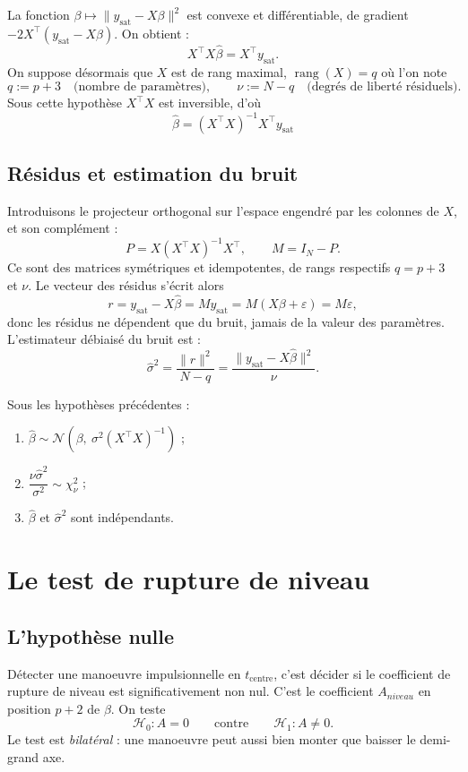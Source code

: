 \documentclass{article}
\theoremstyle{remark}
\begin{document}
La fonction $\beta \mapsto \lVert y_{\mathrm{sat}} - X\beta \rVert^2$ est convexe et différentiable, de
gradient $-2X^{\top}(y_{\mathrm{sat}} - X\beta)$. On obtient : 
\[
X^{\top}X \hat{\beta} = X^{\top} y_{\mathrm{sat}} .
\]
On suppose désormais que $X$ est de rang maximal, $\operatorname{rang}(X) = q$ où l'on note
\[
q := p + 3 \quad \text{(nombre de paramètres)}, \qquad \nu := N - q \quad \text{(degrés de liberté résiduels)} .
\]
Sous cette hypothèse $X^{\top}X$ est inversible, d'où
\[
\boxed{\ \hat{\beta} = (X^{\top}X)^{-1} X^{\top} y_{\mathrm{sat}} \ }
\]

\subsection*{Résidus et estimation du bruit}

Introduisons le projecteur orthogonal sur l'espace engendré par les colonnes de $X$, et son
complément :
\[
P = X(X^{\top}X)^{-1}X^{\top}, \qquad M = I_N - P .
\]
Ce sont des matrices symétriques et idempotentes, de rangs respectifs $q = p+3$ et $\nu$. 
Le vecteur des résidus s'écrit alors
\[
r = y_{\mathrm{sat}} - X\hat{\beta} = M y_{\mathrm{sat}} = M(X\beta + \varepsilon) = M\varepsilon ,
\]
donc les résidus ne dépendent que du bruit, jamais de la valeur des paramètres. 
L'estimateur débiaisé du bruit est : 
\[
\hat{\sigma}^2 = \frac{\lVert r \rVert^2}{N - q} = \frac{\lVert y_{\mathrm{sat}} - X\hat{\beta} \rVert^2}{\nu} .
\]

Sous les hypothèses précédentes :
\begin{enumerate}
    \item $\hat{\beta} \sim \mathcal{N}\left( \beta, \ \sigma^2 (X^{\top}X)^{-1} \right)$ ;
    \item $\dfrac{\nu \hat{\sigma}^2}{\sigma^2} \sim \chi^2_{\nu}$ ;
    \item $\hat{\beta}$ et $\hat{\sigma}^2$ sont indépendants.
\end{enumerate}

\section{Le test de rupture de niveau}

\subsection*{L'hypothèse nulle}

Détecter une manoeuvre impulsionnelle en $t_{\mathrm{centre}}$, c'est décider si le coefficient de
rupture de niveau est significativement non nul. C'est le coefficient $A_{niveau}$ en position $p+2$ de $\beta$.
On teste
\[
\mathcal{H}_0 : A = 0
\qquad \text{contre} \qquad
\mathcal{H}_1 : A \neq 0 .
\]
Le test est \emph{bilatéral} : une manoeuvre peut aussi bien monter que baisser le demi-grand
axe.
\end{document}
